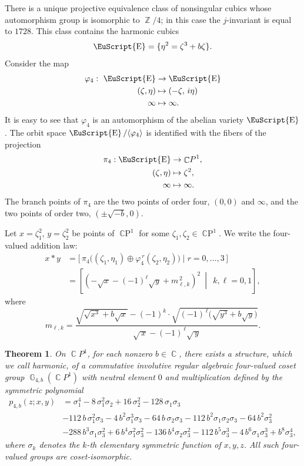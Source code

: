 \documentclass[14pt, dvipsnames]{extarticle}
\theoremstyle{plain}
\newtheorem{theorem}{Theorem}
\theoremstyle{definition}
\theoremstyle{remark}
\let\phi\varphi
\DeclareMathOperator{\E}{\EuScript{E}}
\DeclareMathOperator{\G}{\mathbb{G}}
\DeclareMathOperator{\Z}{\mathbb{Z}}
\DeclareMathOperator{\Cc}{\mathbb{C}}
\DeclareMathOperator{\CP}{\mathbb{C}P}
\begin{document}
There is a unique projective equivalence class of nonsingular cubics whose automorphism group is isomorphic to $\Z/4$; in this case the $j$-invariant is equal to $1728$. This class contains the harmonic cubics \cite[Theorem 3.1.3]{Dolgachev}
$$\E = \{\eta^2 = \zeta^3 + b\zeta\}.$$
Consider the map
\[
\begin{aligned}
\phi_4:\ \E&\to \E\\
(\zeta,\eta)&\mapsto (-\zeta,\, i \eta)\\
\infty &\mapsto\infty.
\end{aligned}
\]
It is easy to see that $\phi_4$ is an automorphism of the abelian variety $\E$. The orbit space $\E/\langle \phi_4 \rangle$ is identified with the fibers of the projection
$$\begin{aligned}
\pi_4: \E&\to \Cc\!P^1,\\
(\zeta, \eta)&\mapsto \zeta^2,\\
\infty &\mapsto\infty.
\end{aligned}$$
{The branch points of $\pi_4$ are the two points of order four, $(0,0)$ and $\infty$, and the two points of order two, $(\pm\sqrt{-b}, 0)$.} 

Let $x = \zeta_1^2$, $y = \zeta_2^2$ be points of $\CP^1$ for some $\zeta_1,\zeta_2\in\CP^1$. We write the four-valued addition law:
\begin{equation}
\begin{aligned}
\label{4_valued_law_multiset}
x\ast y
&=\bigl[\,\pi_4\bigl((\zeta_1,\eta_1)\oplus\phi_4^{\,r}(\zeta_2,\eta_2)\bigr)\mid r=0,\dots,3\,\bigr]\\
&=\left[\left(-\sqrt{x}-(-1)^{\ell}\sqrt{y}+m_{\ell,k}^{\,2}\right)^{\!2}\ \middle|\ \ k, \ell = 0,1\right],
\end{aligned}
\end{equation}
where
$$m_{\ell,k}
=\frac{\sqrt{\sqrt{x^{3}}+b\sqrt{x}}-(-1)^k\cdot\sqrt{(-1)^{\, \ell}\bigl(\sqrt{y^{3}}+b\sqrt{y}\bigr)}}{\sqrt{\,x}-(-1)^{\,\ell}\sqrt{\,y}}.$$

\begin{theorem}\label{4-valued_group}
On $\Cc\!P^1$, for each nonzero $b\in\Cc$, there exists a structure, which we call harmonic, of a commutative involutive {regular} algebraic four-valued coset group $\G_{4, b}(\Cc\!P^1)$ with neutral element $0$ and multiplication defined by the symmetric polynomial
\begin{align*}
p_{4, b}(z; x, y) &= \sigma_{1}^{4}
- 8\, \sigma_{1}^{2} \sigma_{2}
+ 16\, \sigma_{2}^{2}
- 128\, \sigma_{1} \sigma_{3}\\
&- 112\, b\, \sigma_{1}^{2} \sigma_{3}
- 4\, b^{2} \sigma_{1}^{3} \sigma_{3}
- 64\, b\, \sigma_{2} \sigma_{3}
- 112\, b^{2} \sigma_{1} \sigma_{2} \sigma_{3}
- 64\, b^{2} \sigma_{3}^{2}\\
&- 288\, b^{3} \sigma_{1} \sigma_{3}^{2}
+ 6\, b^{4} \sigma_{1}^{2} \sigma_{3}^{2}
- 136\, b^{4} \sigma_{2} \sigma_{3}^{2}
- 112\, b^{5} \sigma_{3}^{3}
- 4\, b^{6} \sigma_{1} \sigma_{3}^{3}
+ b^{8} \sigma_{3}^{4},
\end{align*}
where $\sigma_k$ denotes the $k$-th elementary symmetric function of $x, y, z$. All such four-valued groups are {coset-isomorphic.} 
\end{theorem}
\end{document}
